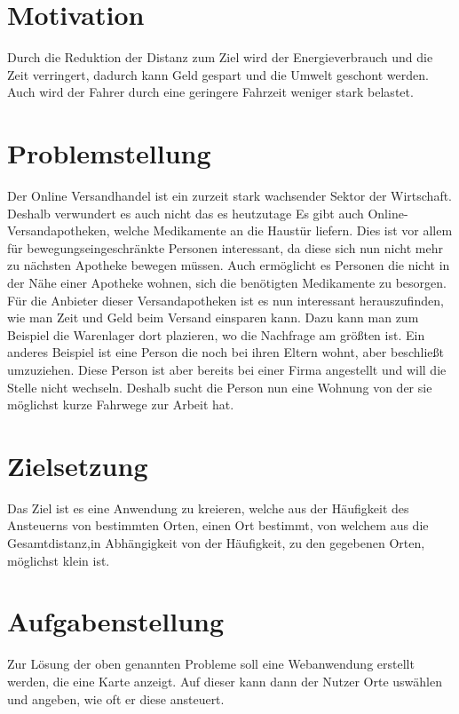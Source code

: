 \documentclass[a4paper, 12pt]{scrreprt}
\begin{document}
\section{Motivation}
Durch die Reduktion der Distanz zum Ziel wird der Energieverbrauch und die Zeit verringert, dadurch kann Geld gespart und die Umwelt geschont werden.
Auch wird der Fahrer durch eine geringere Fahrzeit weniger stark belastet.
\section{Problemstellung}
Der Online Versandhandel ist ein zurzeit stark wachsender Sektor der Wirtschaft.\cite{Stepper2016}
Deshalb verwundert es auch nicht das es heutzutage
Es gibt auch Online-Versandapotheken, welche Medikamente an die Haustür liefern.
Dies ist vor allem für bewegungseingeschränkte Personen interessant, da diese sich nun nicht mehr zu nächsten Apotheke bewegen müssen.
Auch ermöglicht es Personen die nicht in der Nähe einer Apotheke wohnen, sich die benötigten Medikamente zu besorgen.
Für die Anbieter dieser Versandapotheken ist es nun interessant herauszufinden, wie man Zeit und Geld beim Versand einsparen kann.
Dazu kann man zum Beispiel die Warenlager dort plazieren, wo die Nachfrage am größten ist.
Ein anderes Beispiel ist eine Person die noch bei ihren Eltern wohnt, aber beschließt umzuziehen.
Diese Person ist aber bereits bei einer Firma angestellt und will die Stelle nicht wechseln.
Deshalb sucht die Person nun eine Wohnung von der sie möglichst kurze Fahrwege zur Arbeit hat.
\section{Zielsetzung}
Das Ziel ist es eine Anwendung zu kreieren, welche aus der Häufigkeit des Ansteuerns von bestimmten Orten, einen Ort bestimmt, von welchem aus die Gesamtdistanz,in Abhängigkeit von der Häufigkeit, zu den gegebenen Orten, möglichst klein ist.
\section{Aufgabenstellung}
Zur Lösung der oben genannten Probleme soll eine Webanwendung erstellt werden, die eine Karte anzeigt.
Auf dieser kann dann der Nutzer Orte uswählen und angeben, wie oft er diese ansteuert.
\newpage
\end{document}
